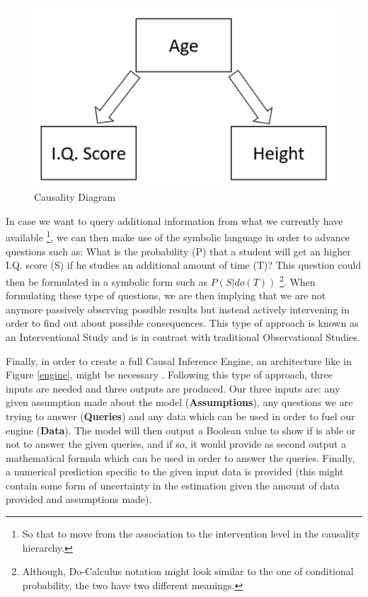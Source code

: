\begin{figure}[ht!]%
    \centering
    \includegraphics[width=0.4\linewidth]{latex/images/caus_d.pdf}
    \vspace{-0.2cm}
    \caption{Causality Diagram}
    \label{dig_ex}
\end{figure}
\vspace{-0.5cm}

In case we want to query additional information from what we currently have available \footnote{So that to move from the association to the intervention level in the causality hierarchy.}, we can then make use of the symbolic language in order to advance questions such as: What is the probability (P) that a student will get an higher I.Q. score (S) if he studies an additional amount of time (T)? This question could then be formulated in a symbolic form such as $P(S|do(T))$  \footnote{Although, Do-Calculus notation might look similar to the one of conditional probability, the two have two different meanings.}. When formulating these type of questions, we are then implying that we are not anymore passively observing possible results but instead actively intervening in order to find out about possible consequences. This type of approach is known as an Interventional Study and is in contrast with traditional Observational Studies.

Finally, in order to create a full Causal Inference Engine, an architecture like in Figure \ref{engine}, might be necessary \cite{why}. Following this type of approach, three inputs are needed and three outputs are produced. Our three inputs are: any given assumption made about the model (\textbf{Assumptions}), any questions we are trying to answer (\textbf{Queries}) and any data which can be used in order to fuel our engine (\textbf{Data}). The model will then output a Boolean value to show if is able or not to answer the given queries, and if so, it would provide as second output a mathematical formula which can be used in order to answer the queries. Finally, a numerical prediction specific to the given input data is provided (this might contain some form of uncertainty in the estimation given the amount of data provided and assumptions made).  

